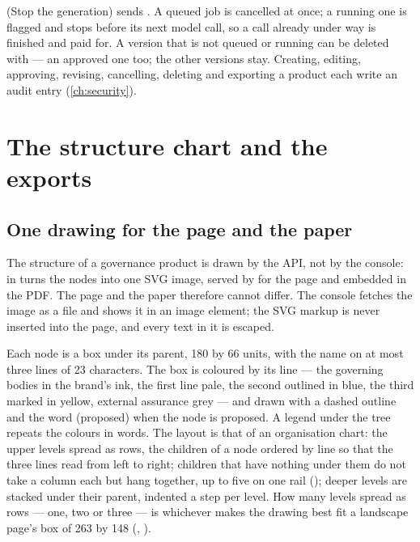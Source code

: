  (Stop the generation) sends .
A queued job is cancelled at once; a running one is flagged and stops before its next model
call, so a call already under way is finished and paid for. A version that is not queued or
running can be deleted with  --- an approved one too; the
other versions stay. Creating, editing, approving, revising, cancelling, deleting and
exporting a product each write an audit entry (\cref{ch:security}).


\section{The structure chart and the exports}\label{sec:programme:outputs}

\subsection{One drawing for the page and the paper}

The structure of a governance product is drawn by the API, not by the console:
 in  turns the nodes into one SVG image, served
by  for the page and embedded in the PDF. The page and
the paper therefore cannot differ. The console fetches the image as a file and shows it in an
image element; the SVG markup is never inserted into the page, and every text in it is
escaped.

Each node is a box under its parent, 180 by 66 units, with the name on at most three lines of
23 characters. The box is coloured by its line --- the governing bodies in the brand's ink,
the first line pale, the second outlined in blue, the third marked in yellow, external
assurance grey --- and drawn with a dashed outline and the word  (proposed) when
the node is proposed. A legend under the tree repeats the colours in words. The layout is
that of an organisation chart: the upper levels spread as rows, the children of a node
ordered by line so that the three lines read from left to right; children that have nothing
under them do not take a column each but hang together, up to five on one rail
(); deeper levels are stacked under their parent, indented a step per level. How
many levels spread as rows --- one, two or three --- is whichever makes the drawing best fit a
landscape page's box of 263 by 148 (, ).

